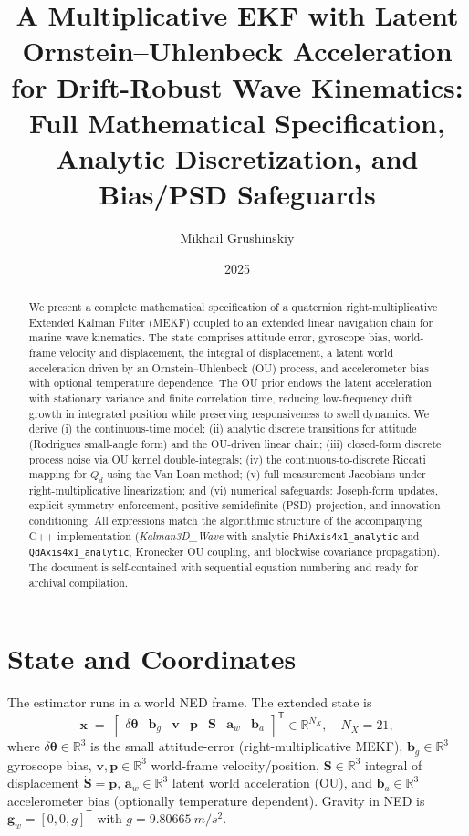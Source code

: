 \documentclass[11pt]{article}
\title{A Multiplicative EKF with Latent Ornstein--Uhlenbeck Acceleration\\
for Drift-Robust Wave Kinematics: Full Mathematical Specification,\\
Analytic Discretization, and Bias/PSD Safeguards}
\author{Mikhail Grushinskiy}
\date{2025}
\newcommand{\vect}[1]{\bm{#1}}
\newcommand{\R}{\mathbb{R}}
\newcommand{\T}{\mathsf{T}}
\begin{document}
\maketitle

\begin{abstract}
We present a complete mathematical specification of a quaternion
right-multiplicative Extended Kalman Filter (MEKF) coupled to an extended
linear navigation chain for marine wave kinematics. The state comprises
attitude error, gyroscope bias, world-frame velocity and displacement, the
integral of displacement, a latent world acceleration driven by an
Ornstein--Uhlenbeck (OU) process, and accelerometer bias with optional
temperature dependence. The OU prior endows the latent acceleration with
stationary variance and finite correlation time, reducing low-frequency
drift growth in integrated position while preserving responsiveness to
swell dynamics. We derive (i) the continuous-time model; (ii) analytic
discrete transitions for attitude (Rodrigues small-angle form) and the
OU-driven linear chain; (iii) closed-form discrete process noise via OU
kernel double-integrals; (iv) the continuous-to-discrete Riccati mapping
for \(Q_d\) using the Van Loan method; (v) full measurement Jacobians under
right-multiplicative linearization; and (vi) numerical safeguards:
Joseph-form updates, explicit symmetry enforcement, positive semidefinite
(PSD) projection, and innovation conditioning. All expressions match the
algorithmic structure of the accompanying C++ implementation
(\textit{Kalman3D\_Wave} with analytic \texttt{PhiAxis4x1\_analytic} and
\texttt{QdAxis4x1\_analytic}, Kronecker OU coupling, and blockwise
covariance propagation). The document is self-contained with sequential
equation numbering and ready for archival compilation.
\end{abstract}

\section{State and Coordinates}
\label{sec:state}
The estimator runs in a world NED frame. The extended state is
\begin{equation}
  \vect{x} \;=\;
  \begin{bmatrix}
    \delta\vect{\theta} & \vect{b}_g & \vect{v} & \vect{p} & \vect{S} & \vect{a}_w & \vect{b}_a
  \end{bmatrix}^{\T}
  \in \R^{N_X}, \quad N_X = 21,
  \label{eq:state}
\end{equation}
where
\(\delta\vect{\theta}\in\R^3\) is the small attitude-error (right-multiplicative MEKF),
\(\vect{b}_g\in\R^3\) gyroscope bias,
\(\vect{v},\vect{p}\in\R^3\) world-frame velocity/position,
\(\vect{S}\in\R^3\) integral of displacement \( \dot{\vect{S}}=\vect{p} \),
\(\vect{a}_w\in\R^3\) latent world acceleration (OU),
and \(\vect{b}_a\in\R^3\) accelerometer bias (optionally temperature dependent).
Gravity in NED is \(\vect{g}_w = [0,0,g]^\T\) with \(g=\SI{9.80665}{m/s^2}\).
\end{document}
